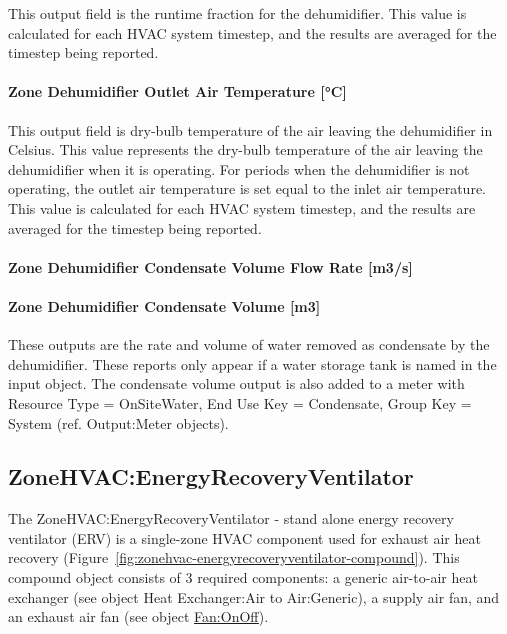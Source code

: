 This output field is the runtime fraction for the dehumidifier. This value is calculated for each HVAC system timestep, and the results are averaged for the timestep being reported.

\paragraph{Zone Dehumidifier Outlet Air Temperature {[}\si{\degreeCelsius}{]}}\label{zone-dehumidifier-outlet-air-temperature-c}

This output field is dry-bulb temperature of the air leaving the dehumidifier in Celsius. This value represents the dry-bulb temperature of the air leaving the dehumidifier when it is operating. For periods when the dehumidifier is not operating, the outlet air temperature is set equal to the inlet air temperature. This value is calculated for each HVAC system timestep, and the results are averaged for the timestep being reported.

\paragraph{Zone Dehumidifier Condensate Volume Flow Rate {[}m3/s{]}}\label{zone-dehumidifier-condensate-volume-flow-rate-m3s}

\paragraph{Zone Dehumidifier Condensate Volume {[}m3{]}}\label{zone-dehumidifier-condensate-volume-m3}

These outputs are the rate and volume of water removed as condensate by the dehumidifier. These reports only appear if a water storage tank is named in the input object. The condensate volume output is also added to a meter with Resource Type = OnSiteWater, End Use Key = Condensate, Group Key = System (ref. Output:Meter objects).

\subsection{ZoneHVAC:EnergyRecoveryVentilator}\label{zonehvacenergyrecoveryventilator}

The ZoneHVAC:EnergyRecoveryVentilator - stand alone energy recovery ventilator (ERV) is a single-zone HVAC component used for exhaust air heat recovery (Figure~\ref{fig:zonehvac-energyrecoveryventilator-compound}). This compound object consists of 3 required components: a generic air-to-air heat exchanger (see object Heat Exchanger:Air to Air:Generic), a supply air fan, and an exhaust air fan (see object \hyperref[fanonoff]{Fan:OnOff}).

